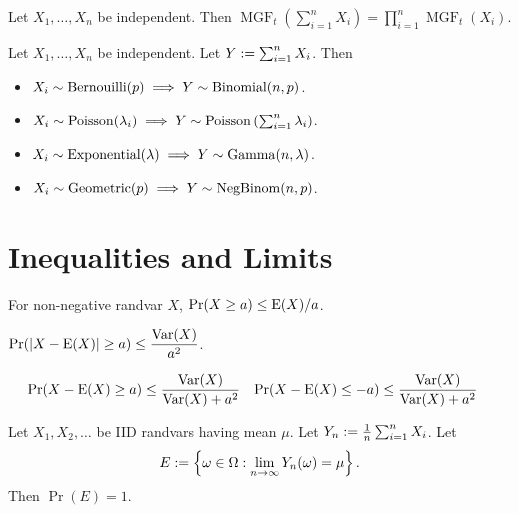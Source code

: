 \documentclass[a4paper, 12pt, fleqn]{article}
\DeclareMathOperator{\MGF}{MGF}
\begin{document}
\begin{theorem}
Let $X_1, \ldots, X_n$ be independent. Then
$\MGF_t\left(\sum_{i=1}^n X_i\right) = \prod_{i=1}^n \MGF_t(X_i)$.
\end{theorem}

\begin{theorem}
Let $X_1, \ldots, X_n$ be independent. Let $Y := \sum_{i=1}^n X_i$. Then
\begin{itemize}
\item $X_i \sim \operatorname{Bernouilli}(p)
    \implies Y \sim \operatorname{Binomial}(n, p)$.
\item $X_i \sim \operatorname{Poisson}(\lambda_i) \implies
    Y \sim \operatorname{Poisson}\left(\sum_{i=1}^n \lambda_i\right)$.
\item $X_i \sim \operatorname{Exponential}(\lambda) \implies
    Y \sim \operatorname{Gamma}(n, \lambda)$.
\item $X_i \sim \operatorname{Geometric}(p) \implies
    Y \sim \operatorname{NegBinom}(n, p)$.
\end{itemize}
\end{theorem}

\section{Inequalities and Limits}

\begin{theorem}[Markov]
For non-negative randvar $X$, $\Pr(X \ge a) \le \operatorname*{E}(X)/a$.
\end{theorem}

\begin{theorem}[Chebyshev]
$\displaystyle \Pr(|X-\operatorname*{E}(X)| \ge a) \le \frac{\operatorname*{Var}(X)}{a^2}$.
\end{theorem}

\begin{theorem}
\begin{align*}
\Pr(X-\operatorname*{E}(X) \ge a) &\le \frac{\operatorname*{Var}(X)}{\operatorname*{Var}(X)+a^2}
& \Pr(X-\operatorname*{E}(X) \le -a) &\le \frac{\operatorname*{Var}(X)}{\operatorname*{Var}(X)+a^2}
\end{align*}
\end{theorem}

\begin{theorem}
Let $X_1, X_2, \ldots$ be IID randvars having mean $\mu$.
Let $Y_n := \frac{1}{n} \sum_{i=1}^n X_i$. Let
\[ E := \left\{\omega \in \Omega: \lim_{n \to \infty} Y_n(\omega) = \mu\right\}. \]
Then $\Pr(E) = 1$.
\end{theorem}
\end{document}
